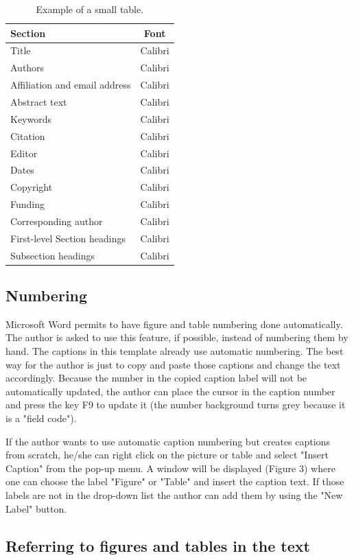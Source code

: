 \documentclass[10pt]{imeko_acta}
\begin{document}
\begin{table}[!b]
	\caption{Example of a small table.}
	\label{tab:tab2}
	\centering
\begin{tabular}{lc}
	\toprule
	Section & Font \\
	\midrule
	Title & Calibri \\
	Authors & Calibri \\
	Affiliation and email address & Calibri \\
	Abstract text & Calibri \\
	Keywords & Calibri \\
	Citation & Calibri \\
	Editor & Calibri \\
	Dates & Calibri \\
	Copyright & Calibri \\
	Funding & Calibri \\
	Corresponding author & Calibri \\
	First-level Section headings  & Calibri \\
	Subsection headings & Calibri \\
	\bottomrule
\end{tabular}
\end{table}

\subsection{Numbering}

Microsoft Word permits to have figure and table numbering done automatically. The author is asked to use this feature, if possible, instead of numbering them by hand. The captions in this template already use automatic numbering. The best way for the author is just to copy and paste those captions and change the text accordingly. Because the number in the copied caption label will not be automatically updated, the author can place the cursor in the caption number and press the key F9 to update it (the number background turns grey because it is a "field code").

If the author wants to use automatic caption numbering but creates captions from scratch, he/she can right click on the picture or table and select "Insert Caption" from the pop-up menu. A window will be displayed (Figure 3) where one can choose the label "Figure" or "Table" and insert the caption text. If those labels are not in the drop-down list the author can add them by using the "New Label" button.


\subsection{Referring to figures and tables in the text}\label{sec:reffig}
\end{document}
